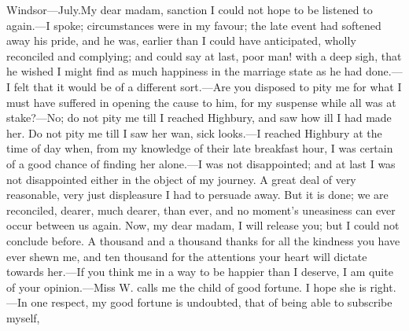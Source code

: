 \begin{mail}{Windsor—July.}{My dear madam,}
sanction I could not hope to be listened to again.—I spoke; circumstances were in my favour; the late event had softened away his pride, and he was, earlier than I could have anticipated, wholly reconciled and complying; and could say at last, poor man! with a deep sigh, that he wished I might find as much happiness in the marriage state as he had done.—I felt that it would be of a different sort.—Are you disposed to pity me for what I must have suffered in opening the cause to him, for my suspense while all was at stake?—No; do not pity me till I reached Highbury, and saw how ill I had made her. Do not pity me till I saw her wan, sick looks.—I reached Highbury at the time of day when, from my knowledge of their late breakfast hour, I was certain of a good chance of finding her alone.—I was not disappointed; and at last I was not disappointed either in the object of my journey. A great deal of very reasonable, very just displeasure I had to persuade away. But it is done; we are reconciled, dearer, much dearer, than ever, and no moment's uneasiness can ever occur between us again. Now, my dear madam, I will release you; but I could not conclude before. A thousand and a thousand thanks for all the kindness you have ever shewn me, and ten thousand for the attentions your heart will dictate towards her.—If you think me in a way to be happier than I deserve, I am quite of your opinion.—Miss W. calls me the child of good fortune. I hope she is right.—In one respect, my good fortune is undoubted, that of being able to subscribe myself,

\end{mail}